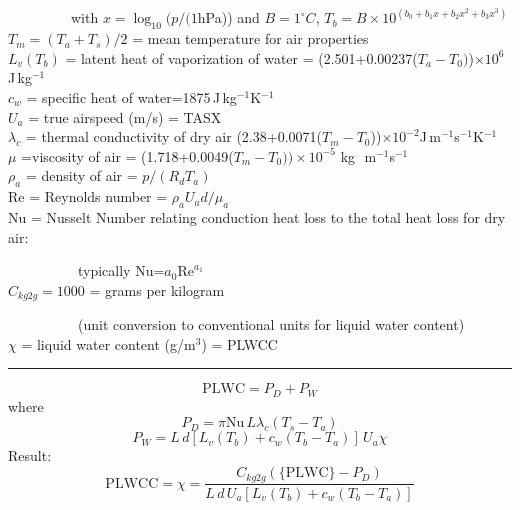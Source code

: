 \begin{hangparagraphs}
{\begin{minipage}[t]{0.95\textwidth}
~~~~~~~~~with $x=\log_{10}(p/(1$hPa)) and $B=1^{\circ}C$,
$T_{b}=B\times10^{(b_{0}+b_{1}x+b_{2}x^{2}+b_{3}x^{3})}$\\
$T_{m}=(T_{a}+T_{s})/2$ = mean temperature for air properties\\
$L_{v}(T_{b})$ = latent heat of vaporization of water
= (2.501+0.00237($T_{a}-T_{0})$)$\times10^{6}$J\,kg$^{-1}$\\
$c_{w}$ =
specific heat of water=1875\,J\,kg$^{-1}$K$^{-1}$\\
$U_{a}$ = true airspeed (m/s) = TASX\\
$\lambda_{c}$ = thermal conductivity of dry air (2.38+0.0071($T_{m}-T_{0}$))$\times10^{-2}$J\,m$^{-1}$s$^{-1}$K$^{-1}$\\
$\mu$ =viscosity of air = (1.718+0.0049($T_{m}-T_{0}))\times10^{-5}$
kg\,~m$^{-1}$s$^{-1}$\\
$\rho_{a}$ = density
of air = $p/(R_{d}T_{a})$\\
Re = Reynolds number = $\rho_{a}U_{a}d/\mu_{a}$\\
Nu = Nusselt Number relating conduction
heat loss to the total heat loss for dry air: 

~~~~~~~~~~typically Nu=$a_{0}\mathrm{Re}^{a_{1}}$\\
$C_{kg2g}=1000$
= grams per kilogram 

~~~~~~~~~~(unit conversion to conventional units for liquid
water content)\\
$\chi$ = liquid water content (g/m$^{3}$) = PLWCC

\noindent \rule[0.5ex]{1\linewidth}{1pt}
\[
\mathrm{PLWC}=P_{D}+P_{W}
\]
where
\[
P_{D}=\pi\mathrm{Nu}\, L\lambda_{c}(T_{s}-T_{a})
\]
\[
P_{W}=L\, d[L_{v}(T_{b})+c_{w}(T_{b}-T_{a})]\, U_{a}\chi
\]
Result:
\[
\mathrm{PLWCC}=\chi=\frac{C_{kg2g}(\mathrm{\{PLWC\}}-P_{D})}{L\, d\, U_{a}[L_{v}(T_{b})+c_{w}(T_{b}-T_{a})]}
\]
%
\end{minipage}}\\
\\



\end{hangparagraphs}
